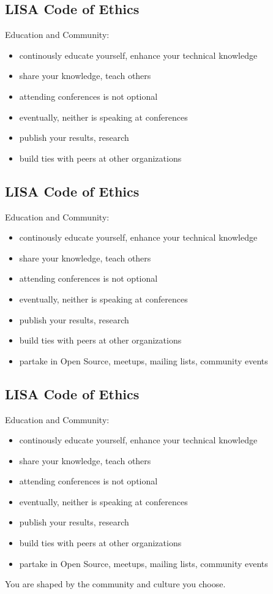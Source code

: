 \documentclass[xga]{xdvislides}
\begin{document}
\subsection{LISA Code of Ethics}
Education and Community:
\begin{itemize}
	\item continously educate yourself, enhance your technical knowledge
	\item share your knowledge, teach others
	\item attending conferences is not optional
	\item eventually, neither is speaking at conferences
	\item publish your results, research
	\item build ties with peers at other organizations
\end{itemize}

\subsection{LISA Code of Ethics}
Education and Community:
\begin{itemize}
	\item continously educate yourself, enhance your technical knowledge
	\item share your knowledge, teach others
	\item attending conferences is not optional
	\item eventually, neither is speaking at conferences
	\item publish your results, research
	\item build ties with peers at other organizations
	\item partake in Open Source, meetups, mailing lists, community events
\end{itemize}

\subsection{LISA Code of Ethics}
Education and Community:
\begin{itemize}
	\item continously educate yourself, enhance your technical knowledge
	\item share your knowledge, teach others
	\item attending conferences is not optional
	\item eventually, neither is speaking at conferences
	\item publish your results, research
	\item build ties with peers at other organizations
	\item partake in Open Source, meetups, mailing lists, community events
\end{itemize}
\vspace{.5in}
You are shaped by the community and culture you choose.
\end{document}
